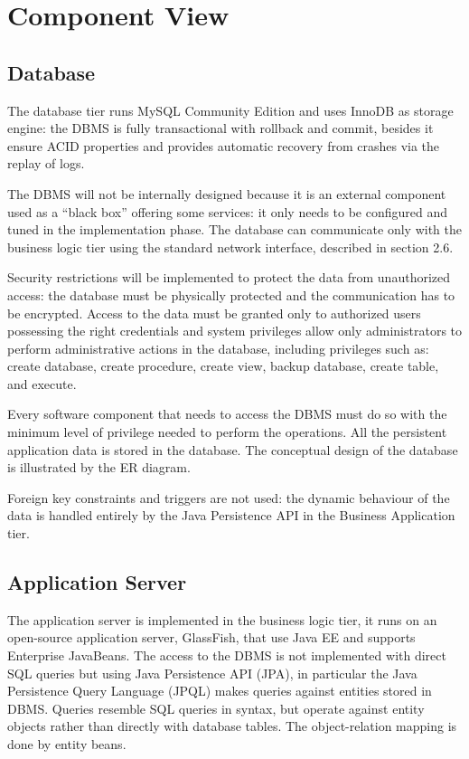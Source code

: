 \section{Component View}
\subsection{Database}
The database tier runs MySQL Community Edition and uses InnoDB as storage engine: the DBMS is fully transactional with rollback and commit, besides it ensure ACID properties and provides automatic recovery from crashes via the replay of logs.

The DBMS will not be internally designed because it is an external component used as a “black box” offering some services: it only needs to be configured and tuned in the implementation phase.
The database can communicate only with the business logic tier using the standard network interface, described in section 2.6. 

Security restrictions will be implemented to protect the data from unauthorized access: the database must be physically protected and the communication has to be encrypted.
Access to the data must be granted only to authorized users possessing the right credentials and system privileges allow only administrators to perform administrative actions in the database, including privileges such as: create database, create procedure, create view, backup database, create table, and execute.

Every software component that needs to access the DBMS must do so with the minimum level of privilege needed to perform the operations. All the persistent application data is stored in the database.
The conceptual design of the database is illustrated by the ER diagram.

Foreign key constraints and triggers are not used: the dynamic behaviour of the data is handled entirely by the Java Persistence API in the Business Application tier.



\subsection{Application Server}
The application server is implemented in the business logic tier, it runs on an open-source application server, GlassFish, that use Java EE and supports Enterprise JavaBeans.
The access to the DBMS is not implemented with direct SQL queries but using Java Persistence API (JPA), in particular the Java Persistence Query Language (JPQL) makes queries against entities stored in DBMS.
Queries resemble SQL queries in syntax, but operate against entity objects rather than directly with database tables.
The object-relation mapping is done by entity beans.


